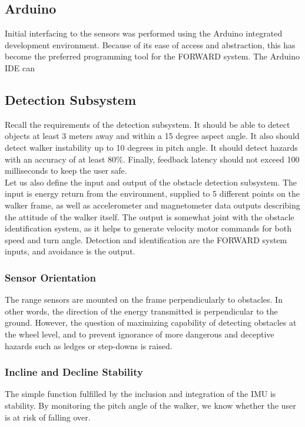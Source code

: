 \subsection{Arduino}
\noindent Initial interfacing to the sensors was performed using the Arduino integrated development environment. Because of its ease of access and abstraction, this has become the preferred programming tool for the FORWARD system. The Arduino IDE can 

\subsection{Detection Subsystem}
\noindent Recall the requirements of the detection subsystem. It should be able to detect objects at least 3 meters away and within a 15 degree aspect angle. It also should detect walker instability up to 10 degrees in pitch angle. It should detect hazards with an accuracy of at least 80\%. Finally, feedback latency should not exceed 100 milliseconds to keep the user safe.\\

\noindent Let us also define the input and output of the obstacle detection subsystem. The input is energy return from the environment, supplied to 5 different points on the walker frame, as well as accelerometer and magnetometer data outputs describing the attitude of the walker itself. The output is somewhat joint with the obstacle identification system, as it helps to generate velocity motor commands for both speed and turn angle. Detection and identification are the FORWARD system inputs, and avoidance is the output.

\subsubsection{Sensor Orientation}
\noindent The range sensors are mounted on the frame perpendicularly to obstacles. In other words, the direction of the energy transmitted is perpendicular to the ground. However, the question of maximizing capability of detecting obstacles at the wheel level, and to prevent ignorance of more dangerous and deceptive hazards such as ledges or step-downs is raised.\\

\subsubsection{Incline and Decline Stability}
\noindent The simple function fulfilled by the inclusion and integration of the IMU is stability. By monitoring the pitch angle of the walker, we know whether the user is at risk of falling over.\\

